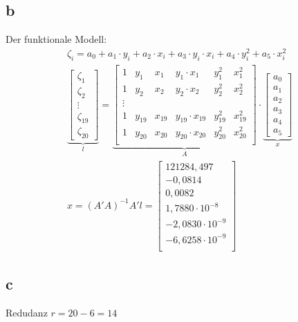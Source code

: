 \subsection{b}
Der funktionale Modell:
\begin{gather*}
	\zeta_i = a_0 + a_1 \cdot y_i + a_2 \cdot x_i + a_3 \cdot y_i \cdot x_i + a_4 \cdot y_i^2 + a_5 \cdot x_i^2 \\
	\underbrace{\begin{bmatrix}
		\zeta_1 \\
		\zeta_2 \\
		\vdots \\
		\zeta_{19} \\
		\zeta_{20}
	\end{bmatrix}}_{\text{$l$}} = \underbrace{\begin{bmatrix}
		1 & y_1 & x_1 & y_1 \cdot x_1 & y_1^2 & x_1^2 \\
		1 & y_2 & x_2 & y_2 \cdot x_2 & y_2^2 & x_2^2 \\
		\vdots \\
		1 & y_{19} & x_{19} & y_{19} \cdot x_{19} & y_{19}^2 & x_{19}^2 \\
		1 & y_{20} & x_{20} & y_{20} \cdot x_{20} & y_{20}^2 & x_{20}^2 \\
	\end{bmatrix}}_{\text{$A$}} \cdot \underbrace{\begin{bmatrix}
		a_0 \\
		a_1 \\
		a_2 \\
		a_3 \\
		a_4 \\
		a_5
	\end{bmatrix}}_{\text{$x$}} \\
	x = (A'A)^{-1}A'l = \begin{bmatrix}
		121284,497 \\
		-0,0814 \\
		0,0082 \\
		1,7880 \cdot 10^{-8} \\
		-2,0830 \cdot 10^{-9} \\
		-6,6258 \cdot 10^{-9} \\
	\end{bmatrix}
\end{gather*}
\subsection{c}
Redudanz $r = 20 - 6 = 14$